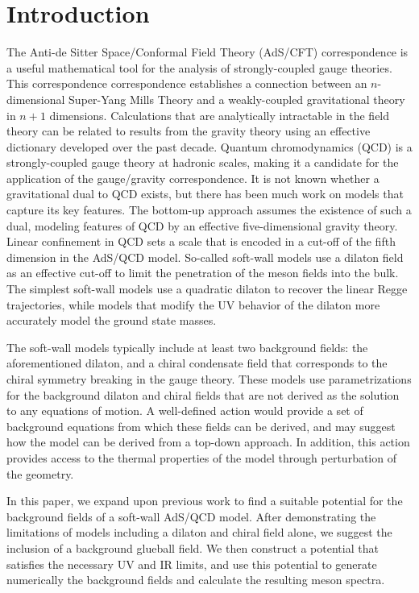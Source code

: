 \section{Introduction}

The Anti-de Sitter Space/Conformal Field Theory (AdS/CFT) correspondence is a useful mathematical tool for the analysis of strongly-coupled gauge theories.
This correspondence correspondence establishes a connection between an $n$-dimensional Super-Yang Mills Theory and a weakly-coupled gravitational theory in $n+1$ dimensions. 
Calculations that are analytically intractable in the field theory can be related to results from the gravity theory using an effective dictionary developed over the past decade. 
Quantum chromodynamics (QCD) is a strongly-coupled gauge theory at hadronic scales, making it a candidate for the application of the gauge/gravity correspondence.
It is not known whether a gravitational dual to QCD exists, but there has been much work on models that capture its key features.
The bottom-up approach assumes the existence of such a dual, modeling features of QCD by an effective five-dimensional gravity theory.
Linear confinement in QCD sets a scale that is encoded in a cut-off of the fifth dimension in the AdS/QCD model. 
So-called soft-wall models use a dilaton field as an effective cut-off to limit the penetration of the meson fields into the bulk. 
The simplest soft-wall models use a quadratic dilaton to recover the linear Regge trajectories, while models that modify the UV behavior of the dilaton more accurately model the ground state masses.

The soft-wall models typically include at least two background fields: the aforementioned dilaton, and a chiral condensate field that corresponds to the chiral symmetry breaking in the gauge theory.
These models use parametrizations for the background dilaton and chiral fields that are not derived as the solution to any equations of motion. 
A well-defined action would provide a set of background equations from which these fields can be derived, and may suggest how the model can be derived from a top-down approach. 
In addition, this action provides access to the thermal properties of the model through perturbation of the geometry.

In this paper, we expand upon previous work to find a suitable potential for the background fields of a soft-wall AdS/QCD model. 
After demonstrating the limitations of models including a dilaton and chiral field alone, we suggest the inclusion of a background glueball field. 
We then construct a potential that satisfies the necessary UV and IR limits, and use this potential to generate numerically the background fields and calculate the resulting meson spectra.


